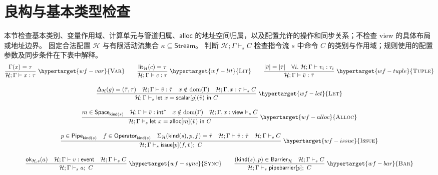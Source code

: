 \documentclass[UTF8,a4paper,11pt,fontset=fandol]{ctexart}
\newcommand{\kw}[1]{\ensuremath{\mathsf{#1}}}
\newcommand{\infer}[2]{\displaystyle\frac{\displaystyle #1}{\displaystyle #2}}
\begin{document}
\section{良构与基本类型检查}
\label{sec:wf}
本节检查基本类别、变量作用域、计算单元与管道归属、\kw{alloc} 的地址空间归属，以及配置允许的操作和同步关系；不检查 view 的具体布局或地址边界。
固定合法配置 $\mathcal H$ 与有限活动流集合 $\kappa\subseteq\mathsf{Stream}$。
判断 $\mathcal H;\Gamma\vdash_s C$ 检查指令流 $s$ 中命令 $C$ 的类别与作用域；规则使用的配置参数及同步条件在下表中解释。
\begingroup\small
\setlength{\abovedisplayskip}{5pt}\setlength{\belowdisplayskip}{5pt}
\begin{equation*}
\begin{gathered}
\infer{\Gamma(x)=\tau}{\mathcal H;\Gamma\vdash x:\tau}\;\hypertarget{wf-var}{\textsc{Var}}
\qquad
\infer{\mathsf{lit}_{\mathcal H}(c)=\tau}{\mathcal H;\Gamma\vdash c:\tau}\;\hypertarget{wf-lit}{\textsc{Lit}}
\qquad
\infer{|\bar v|=|\bar\tau|\quad\forall i.\ \mathcal H;\Gamma\vdash v_i:\tau_i}
 {\mathcal H;\Gamma\vdash\bar v:\bar\tau}\;\hypertarget{wf-tuple}{\textsc{Tuple}}\\[1em]
\infer{\Delta_{\mathcal H}(g)=(\bar\tau,\tau)\quad\mathcal H;\Gamma\vdash\bar v:\bar\tau\quad
 x\notin\mathrm{dom}(\Gamma)\quad\mathcal H;\Gamma,x:\tau\vdash_s C}
 {\mathcal H;\Gamma\vdash_s\kw{let}\ x=\kw{scalar}[g](\bar v)\ \kw{in}\ C}
 \;\hypertarget{wf-let}{\textsc{Let}}\\[1em]
\infer{m\in\mathsf{Space}_{\mathsf{kind}(s)}\quad\mathcal H;\Gamma\vdash\bar v:\mathsf{int}^*\quad
 x\notin\mathrm{dom}(\Gamma)\quad\mathcal H;\Gamma,x:\mathsf{view}\vdash_s C}
 {\mathcal H;\Gamma\vdash_s\kw{let}\ x=\kw{alloc}[m](\bar v)\ \kw{in}\ C}
 \;\hypertarget{wf-alloc}{\textsc{Alloc}}\\[1em]
\infer{p\in\mathsf{Pipe}_{\mathsf{kind}(s)}\quad f\in\mathsf{Operator}_{\mathsf{kind}(s)}\quad
 \Sigma_{\mathcal H}(\mathsf{kind}(s),p,f)=\bar\tau\quad\mathcal H;\Gamma\vdash\bar v:\bar\tau\quad\mathcal H;\Gamma\vdash_s C}
 {\mathcal H;\Gamma\vdash_s\kw{issue}[p](f,\bar v);\ C}
 \;\hypertarget{wf-issue}{\textsc{Issue}}\\[1em]
\infer{\mathsf{ok}_{\mathcal H,s}(a)\quad\mathcal H;\Gamma\vdash v:\mathsf{event}\quad\mathcal H;\Gamma\vdash_s C}
 {\mathcal H;\Gamma\vdash_s a;\ C}\;\hypertarget{wf-sync}{\textsc{Sync}}
\qquad
\infer{(\mathsf{kind}(s),p)\in\mathsf{Barrier}_{\mathcal H}\quad\mathcal H;\Gamma\vdash_s C}
 {\mathcal H;\Gamma\vdash_s\kw{pipebarrier}[p];\ C}\;\hypertarget{wf-bar}{\textsc{Bar}}\\[1em]

\end{gathered}
\end{equation*}
\end{document}
